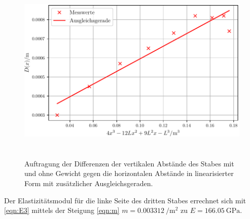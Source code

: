 
\begin{figure}

  \centering
  \includegraphics[width=12cm, height=9cm]{./plots/Stange3b.pdf}
  \caption{Auftragung der Differenzen der vertikalen Abstände des Stabes mit und ohne Gewicht gegen die horizontalen Abstände in linearisierter Form mit zusätzlicher Ausgleichsgeraden.}
  \label{fig:plot3b}
\end{figure}
\noindent Der Elastizitätsmodul für die linke Seite des dritten Stabes
errechnet sich mit \eqref{eqn:E3}
mittels der Steigung \eqref{eqn:m}
$m =\SI[per-mode=fraction]{0.003312}{\per\square\meter}$ zu $E = \SI{166.05}{\giga\pascal}$.
